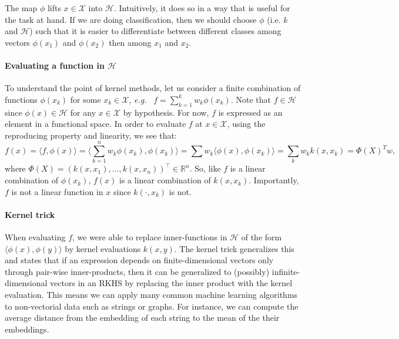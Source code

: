 The map $\phi$ lifts $x\in\mathcal X$ into $\mathcal H$. Intuitively, it does so in a way that is useful for the task at hand. If we are doing classification, then we should choose $\phi$ (i.e. $k$ and $\mathcal H$) such that it is easier to differentiate between different classes among vectors $\phi(x_1)$ and $\phi(x_2)$ then among $x_1$ and $x_2$. %

\paragraph{Evaluating a function in $\mathcal H$}
To understand the point of kernel methods, let us consider a finite combination of functions $\phi(x_k)$ for some $x_k\in\mathcal X$, \emph{e.g.\ } $f= \sum_{k=1}^k w_k \phi(x_k)$. Note that $f\in\mathcal H$ since $\phi(x)\in\mathcal H$ for any $x\in\mathcal X$ by hypothesis. For now, $f$ is expressed as an element in a functional space. In order to evaluate $f$ at $x\in\mathcal X$, using the reproducing property and linearity, we see that:
$$f(x) = \langle f, \phi(x)\rangle = \langle \sum_{k=1}^n w_k\phi(x_k), \phi(x_k)\rangle= \sum w_k \langle \phi(x), \phi(x_k)\rangle = \sum_{k}w_k k(x, x_k)= \Phi(X)^Tw,$$
where $\Phi(X) = (k(x, x_1), \ldots, k(x, x_n))^\top\in\mathbb R^n$. So, like $f$ is a linear combination of $\phi(x_k)$, $f(x)$ is a linear combination of $k(x, x_k)$. Importantly, $f$ is not a linear function in $x$ since $k(\cdot, x_k)$ is not.

\paragraph{Kernel trick}
When evaluating $f$, we were able to replace inner-functions in $\mathcal H$ of the form $\langle \phi(x), \phi(y)\rangle$ by kernel evaluations $k(x, y)$. The kernel trick generalizes this and states that if an expression depends on finite-dimensional vectors only through pair-wise inner-products, then it can be generalized to (possibly) infinite-dimensional vectors in an RKHS by replacing the inner product with the kernel evaluation. This means we can apply many common machine learning algorithms to non-vectorial data such as strings or graphs. For instance, we can compute the average distance from the embedding of each string to the mean of the their embeddings.

